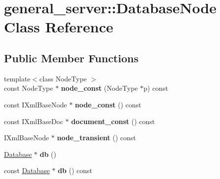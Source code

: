 \hypertarget{classgeneral__server_1_1DatabaseNode}{\section{general\-\_\-server\-:\-:\-Database\-Node \-Class \-Reference}
\label{classgeneral__server_1_1DatabaseNode}
}
\subsection*{\-Public \-Member \-Functions}
\begin{DoxyCompactItemize}
\item 
\hypertarget{classgeneral__server_1_1DatabaseNode_ac5cdfaf1e07fe2263d111c0d065117fb}{{\footnotesize template$<$class Node\-Type $>$ }\\const \-Node\-Type $\ast$ {\bfseries node\-\_\-const} (\-Node\-Type $\ast$p) const }\label{classgeneral__server_1_1DatabaseNode_ac5cdfaf1e07fe2263d111c0d065117fb}

\item 
\hypertarget{classgeneral__server_1_1DatabaseNode_a4eb9ec7b0bb22dc54001fe8549762449}{const \-I\-Xml\-Base\-Node $\ast$ {\bfseries node\-\_\-const} () const }\label{classgeneral__server_1_1DatabaseNode_a4eb9ec7b0bb22dc54001fe8549762449}

\item 
\hypertarget{classgeneral__server_1_1DatabaseNode_a2df490dee0c237e4a3304de4e7119885}{const \-I\-Xml\-Base\-Doc $\ast$ {\bfseries document\-\_\-const} () const }\label{classgeneral__server_1_1DatabaseNode_a2df490dee0c237e4a3304de4e7119885}

\item 
\hypertarget{classgeneral__server_1_1DatabaseNode_aa72f84371c32da25f348d459e289d60d}{\-I\-Xml\-Base\-Node $\ast$ {\bfseries node\-\_\-transient} () const }\label{classgeneral__server_1_1DatabaseNode_aa72f84371c32da25f348d459e289d60d}

\item 
\hypertarget{classgeneral__server_1_1DatabaseNode_a337186be96185c78f85fd7cba113d002}{\hyperlink{classgeneral__server_1_1Database}{\-Database} $\ast$ {\bfseries db} ()}\label{classgeneral__server_1_1DatabaseNode_a337186be96185c78f85fd7cba113d002}

\item 
\hypertarget{classgeneral__server_1_1DatabaseNode_a5cb2c9885009738fbe127d09b90e05fc}{const \hyperlink{classgeneral__server_1_1Database}{\-Database} $\ast$ {\bfseries db} () const }\label{classgeneral__server_1_1DatabaseNode_a5cb2c9885009738fbe127d09b90e05fc}


\end{DoxyCompactItemize}
